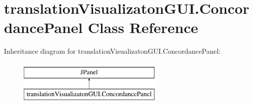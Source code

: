 \hypertarget{classtranslation_visualizaton_g_u_i_1_1_concordance_panel}{}\section{translation\+Visualizaton\+G\+U\+I.\+Concordance\+Panel Class Reference}
\label{classtranslation_visualizaton_g_u_i_1_1_concordance_panel}
Inheritance diagram for translation\+Visualizaton\+G\+U\+I.\+Concordance\+Panel\+:\begin{figure}[H]
\begin{center}
\leavevmode
\includegraphics[height=2.000000cm]{classtranslation_visualizaton_g_u_i_1_1_concordance_panel}
\end{center}
\end{figure}

